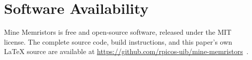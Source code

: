 \section*{Software Availability}

Mine Memristors is free and open-source software, released under the MIT license. The
complete source code, build instructions, and this paper's own \LaTeX{} source are
available at \url{https://github.com/rpicos-uib/mine-memristors}~\cite{picos2026minememristors}.
